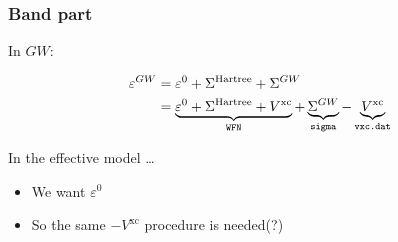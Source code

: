 \documentclass{beamer}
\newcommand{\shortcode}[1]{\texttt{#1}}
\begin{document}
\begin{frame}
\frametitle{Band part}

In $GW$:

\begin{equation}
    \begin{aligned}
        \varepsilon^{GW} &= \varepsilon^0 + \Sigma^{\text{Hartree}} + \Sigma^{GW} \\
        &= \underbrace{\varepsilon^0 + \Sigma^{\text{Hartree}} + V^{\text{xc}}}_{\text{\shortcode{WFN}}} 
        + \underbrace{\Sigma^{GW}}_{\text{\shortcode{sigma}}} 
        - \underbrace{V^{\text{xc}}}_{\text{\shortcode{vxc.dat}}}
    \end{aligned}
\end{equation}

In the effective model \dots
\begin{itemize}
    \item We want $\varepsilon^0$ 
    \item So the same $-V^{\text{xc}}$ procedure is needed(?)
\end{itemize}

\end{frame}
\end{document}
